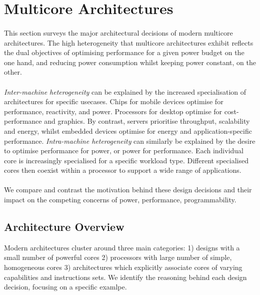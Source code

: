 
\section{Multicore Architectures}
\paragraph{}  This section surveys the major architectural decisions of modern multicore 
architectures. The high heterogeneity that multicore architectures exhibit
reflects the dual objectives of optimising performance
for a given power budget on the one hand, and reducing power
consumption whilst keeping power constant, on the other. 

\paragraph{} \emph{Inter-machine heterogeneity} can be explained by the
increased specialisation of  architectures for specific usecases. Chips for
mobile devices optimise for performance, reactivity, and power.
Processors for desktop optimise for cost-performance and graphics.
By contrast, servers prioritise throughput, scalability and energy,
whilst embedded devices optimise for energy and application-specific
performance. \emph {Intra-machine heterogeneity} can 
similarly be explained by the desire to optimise performance for power, or power
for performance. Each individual core is increasingly specialised
for a specific workload type. Different specialised cores then coexist within
a processor to support a wide range of applications. 

\paragraph{} We compare and contrast the motivation behind these
design decisions and their impact on the competing
concerns of power, performance, programmability.


\subsection{Architecture Overview}


Modern architectures cluster around three main categories:
1) designs with a small number of powerful cores 2) processors with large number of
simple, homogeneous cores 3) architectures which explicitly associate
cores of varying capabilities and instructions sets. We identify the
reasoning behind each design decision, focusing on a specific examlpe. 


